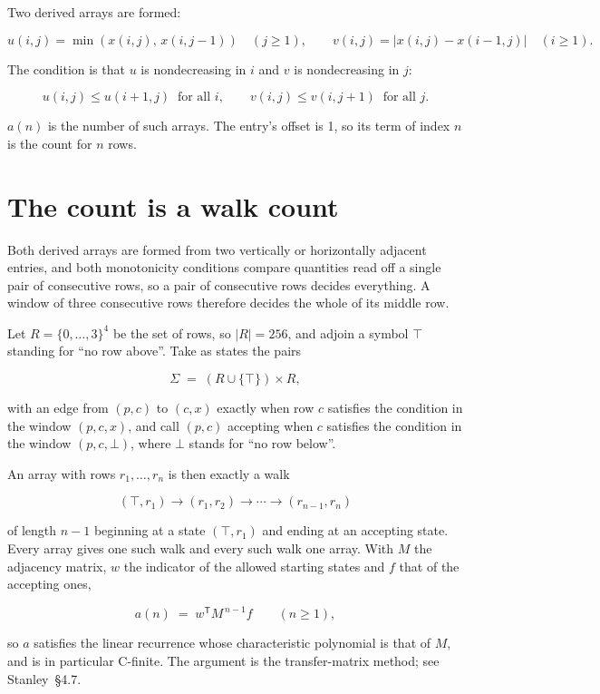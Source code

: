 \documentclass[11pt]{article}
\theoremstyle{definition}
\begin{document}
Two derived arrays are formed:

\[u(i,j) = \min(x(i,j),\,x(i,j{-}1))\quad (j \ge 1), \qquad v(i,j) = \lvert x(i,j) - x(i{-}1,j)\rvert\quad (i \ge 1).\]

The condition is that $u$ is nondecreasing in $i$ and $v$ is nondecreasing in $j$:

\[u(i,j) \le u(i{+}1,j) \ \text{ for all } i, \qquad v(i,j) \le v(i,j{+}1) \ \text{ for all } j.\]

$a(n)$ is the number of such arrays. The entry's offset is 1, so its term of index $n$ is the count for $n$ rows.

\section{The count is a walk count}

Both derived arrays are formed from two vertically or horizontally adjacent entries, and both monotonicity conditions compare quantities read off a single pair of consecutive rows, so a pair of consecutive rows decides everything. A window of three consecutive rows therefore decides the whole of its middle row.

Let $R = \{0,\dots,3\}^{4}$ be the set of rows, so $|R| = 256$, and adjoin a symbol $\top$ standing for ``no row above''. Take as states the pairs

\[\Sigma \;=\; (R \cup \{\top\}) \times R,\]

with an edge from $(p,c)$ to $(c,x)$ exactly when row $c$ satisfies the condition in the window $(p,c,x)$, and call $(p,c)$ accepting when $c$ satisfies the condition in the window $(p,c,\bot)$, where $\bot$ stands for ``no row below''.

An array with rows $r_1,\dots,r_n$ is then exactly a walk

\[(\top,r_1) \to (r_1,r_2) \to \cdots \to (r_{n-1},r_n)\]

of length $n-1$ beginning at a state $(\top,r_1)$ and ending at an accepting state. Every array gives one such walk and every such walk one array. With $M$ the adjacency matrix, $w$ the indicator of the allowed starting states and $f$ that of the accepting ones,

\[a(n) \;=\; w^{\mathsf T} M^{\,n-1} f \qquad (n \ge 1),\]

so $a$ satisfies the linear recurrence whose characteristic polynomial is that of $M$, and is in particular C-finite. The argument is the transfer-matrix method; see Stanley~\S4.7.
\end{document}
